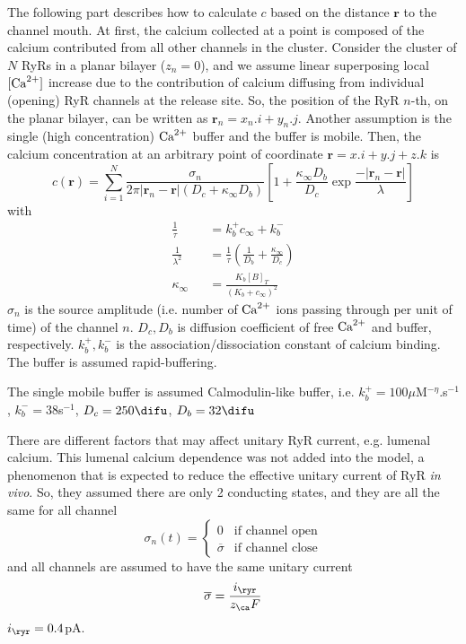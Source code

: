 The following part describes how to calculate $c$ based on the distance
$\mathbf{r}$ to the channel mouth. At first, the calcium collected at a point is
composed of the calcium contributed from all other channels in the cluster.
Consider the cluster of $N$ RyRs in a planar bilayer
($z_n=0$), and we assume linear superposing local $[{\text{Ca}^{2+}}]$ increase due to the contribution of
calcium diffusing from individual (opening) RyR channels at the
release site. So, the position of the RyR $n$-th, on the planar bilayer, can be
written as $\mathbf{r}_n=x_n.i+y_n.j$. Another assumption is the single (high
concentration) ${\text{Ca}^{2+}}$ buffer and the buffer is mobile. Then, the
calcium concentration at an arbitrary point of coordinate
$\mathbf{r}=x.i+y.j+z.k$ is
\begin{equation}
  \label{eq:1144}
  c(\mathbf{r})=\sum^N_{i=1}\frac{\sigma_n}{2\pi|\mathbf{r}_n-\mathbf{r}|(D_c+\kappa_\infty
    D_b)}\left[1+\frac{\kappa_\infty D_b}{D_c}\exp\frac{-|\mathbf{r}_n-\mathbf{r}|}{\lambda}\right]
\end{equation}
with
\begin{eqnarray}
  \label{eq:1145}
  \frac{1}{\tau} &&= k^+_bc_\infty + k^-_b \\
  \frac{1}{\lambda^2}&&=\frac{1}{\tau}\left(\frac{1}{D_b}+\frac{\kappa_\infty}{D_c}\right)
  \\
  \kappa_\infty &&= \frac{K_b[B]_T}{(K_b+c_\infty)^2}
\end{eqnarray}
$\sigma_n$ is the source amplitude (i.e. number of ${\text{Ca}^{2+}}$ ions passing
through per unit of time) of the channel $n$. $D_c,D_b$ is diffusion
coefficient of free ${\text{Ca}^{2+}}$ and buffer, respectively. $k^+_b,k^-_b$ is
the association/dissociation constant of calcium binding. The
buffer is assumed rapid-buffering.

\begin{framed}
  The single mobile buffer is assumed Calmodulin-like buffer, i.e.
  $k^+_b=100\mu$M$^{-\eta}$.s$^{-1}$, $k^-_b=38$s$^{-1}$,
  $D_c=250\difu$, $D_b=32\difu$
\end{framed}
\begin{framed}
  There are different factors that may affect unitary RyR current,
  e.g. lumenal calcium. This lumenal calcium dependence was
  not added into the model, a phenomenon that is expected to reduce the
  effective unitary current of RyR {\it in vivo}. So, they assumed there are
  only 2 conducting states, and they are all the  same for all channel
  \begin{equation}
    \label{eq:1132}
    \sigma_n(t) = \left\{
      \begin{array}{ll}
        0 & \text{if channel open}\\
        \overline{\sigma} & \text{if channel close}
      \end{array}
    \right.
  \end{equation}
  and all channels are assumed to have the same unitary current
  \begin{equation}
    \label{eq:1133}
    \overline{\sigma} = \frac{i_\ryr}{z_\ca F}
  \end{equation}
  $i_\ryr=0.4$pA.
\end{framed}

